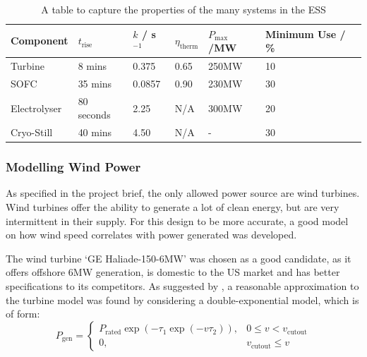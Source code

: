 %
    \begin{table}[ht]
    \label{tbl:powercomp}
            \centering
        \begin{tabular}{||l l l l l l||}
                \hline
                Component & $t_{\text{rise}}$ & $k$ / s$^{-1}$ & $\eta_{\text{therm}}$ & $P_{\text{max}}$/MW& Minimum Use / \%\\
                \hline
                \hline
                Turbine& 8 mins & 0.375 & 0.65 & 250MW & 10\\
                \hline
                SOFC& 35 mins & 0.0857 & 0.90 & 230MW & 30\\
                \hline
                Electrolyser& 80 seconds & 2.25 & N/A & 300MW & 20\\
                \hline
                Cryo-Still & 40 mins & 4.50 & N/A & - & 30\\
                \hline
        \end{tabular}
        \caption{A table to capture the properties of the many systems in the ESS}
                \label{tbl:time}
    \end{table}

\subsubsection{Modelling Wind Power}

As specified in the project brief, the only allowed power source are wind turbines.
Wind turbines offer the ability to generate a lot of clean energy, but are very intermittent in their supply.
For this design to be more accurate, a good model on how wind speed correlates with power generated was developed.

The wind turbine `GE Haliade-150-6MW' was chosen as a good candidate, as it offers offshore 6MW generation, is domestic to the US market and has better specifications to its competitors.
As suggested by \cite{power:wturbine}, a reasonable approximation to the turbine model was found by considering a double-exponential model, which is of form:
%
\begin{equation}
        \label{eqn:wturbexm}
        P_{\text{gen}} =
        \begin{cases}
                P_{\text{rated}} \exp ( -\tau_1 \exp (-v \tau_2)),& 0 \leq v < v_{\text{cutout}}\\
                0,& v_{\text{cutout}} \leq v
        \end{cases}
\end{equation}

